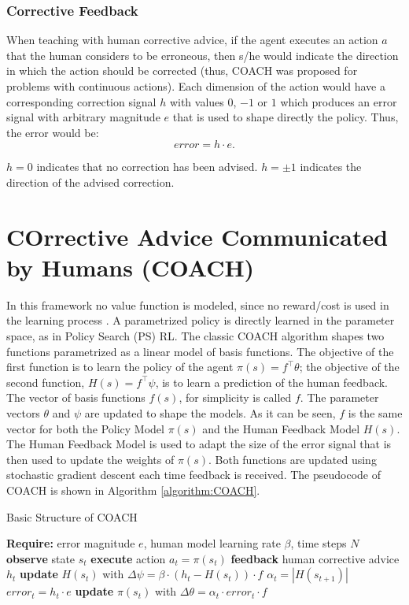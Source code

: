 \subsubsection{Corrective Feedback}
When teaching with human corrective advice, if the agent executes an action $a$ that the human considers to be erroneous, then s/he would indicate the direction in which the action should be corrected (thus, COACH was proposed for problems with continuous actions). Each dimension of the action would have a corresponding correction signal $h$ with values $0$, $-1$ or $1$ which produces an error signal with arbitrary magnitude $e$ that is used to shape directly the policy. Thus, the error would be: 
\begin{equation}\label{eq:error}
    error=h \cdot e.
\end{equation}

$h=0$ indicates that no correction has been advised. $h=\pm 1$ indicates the direction of the advised correction.

\section{COrrective Advice Communicated by Humans (COACH)}
In this framework no value function is modeled, since no reward/cost is used in the learning process \cite{Celemin2018AnInteractive}. A parametrized policy is directly learned in the parameter space, as in Policy Search (PS) RL. 
The classic COACH algorithm shapes two functions parametrized as a linear model of basis functions. The objective of the first function is to learn the policy of the agent $\pi(s)=f^{\top}\theta$; the objective of the second function, $H(s)=f^{\top}\psi$, is to learn a prediction of the human feedback. The vector of basis functions $f(s)$, for simplicity is called $f$. The parameter vectors $\theta$ and $\psi$ are updated to shape the models. As it can be seen, $f$ is the same vector for both the Policy Model $\pi(s)$ and the Human Feedback Model  $H(s)$. The Human Feedback Model is used to adapt the size of the error signal that is then used to update the weights of $\pi(s)$. Both functions are updated using stochastic gradient descent each time feedback is received. The pseudocode of COACH is shown in Algorithm \ref{algorithm:COACH}.

\begin{algorithm}[H]
\caption{Basic Structure of COACH}\label{algorithm:COACH}
\begin{algorithmic}[1]
\State \textbf{Require:} error magnitude $e$, human model learning rate $\beta$, time steps $N$
\State \textbf{observe} state $s_{t}$
\State \textbf{execute} action $a_{t}=\pi(s_{t})$
\State \textbf{feedback} human corrective advice $h_{t}$
\State \textbf{update} $H(s_{t})$ with $\Delta \psi = \beta\cdot (h_{t}-H(s_{t}))\cdot f$
\State $\alpha_{t} = |H(s_{t+1})|$
\State $error_{t} = h_{t}\cdot e$
\State \textbf{update} $\pi(s_{t})$ with $\Delta \theta = \alpha_{t} \cdot error_{t} \cdot f$
\EndIf
\EndFor
\end{algorithmic}
\end{algorithm}